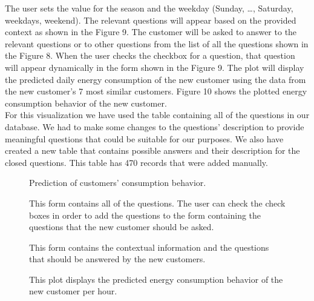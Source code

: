 \documentclass{sig-alternate-10pt}
\begin{document}
The user sets the value for the season and the weekday (Sunday, \ldots , Saturday,  weekdays, weekend). The relevant questions will appear based on the provided context as shown in the Figure 9. The customer will be asked to answer to the relevant questions or to other questions from the list of all the questions shown in the Figure 8. When the user checks the checkbox for a question, that question will appear dynamically in the form shown in the Figure 9. The plot will display the predicted daily energy consumption of the new customer using the data from the new customer's 7 most similar customers. Figure 10 shows the plotted energy consumption behavior of the new customer.\\

For this visualization we have used the table containing all of the questions in our database. We had to make some changes to the questions' description to provide meaningful questions that could be suitable for our purposes. We also have created a new table that contains possible answers and their description for the closed questions. This table has 470 records that were added manually.\\


\begin{figure*}
\centering
{}
\caption{Prediction of customers' consumption behavior.}
\end{figure*}

\begin{figure}
\centering
{}
\caption{This form contains all of the questions. The user can check the check boxes in order to add the questions to the form containing the questions that the new customer should be asked.}
\end{figure}

\begin{figure}
\centering
{}
\caption{This form contains the contextual information and the questions that should be answered by the new customers.}
\end{figure}

\begin{figure}
\centering
{}
\caption{This plot displays the predicted energy consumption behavior of the new customer per hour.}
\end{figure}
\end{document}
